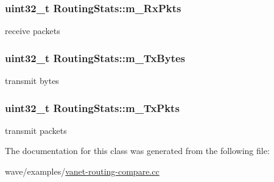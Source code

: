 \subsubsection[{\texorpdfstring{m\+\_\+\+Rx\+Pkts}{m_RxPkts}}]{\setlength{\rightskip}{0pt plus 5cm}uint32\+\_\+t Routing\+Stats\+::m\+\_\+\+Rx\+Pkts\hspace{0.3cm}{\ttfamily [private]}}\hypertarget{classRoutingStats_a794a76bc6ef6fa000c846c970909e441}{}\label{classRoutingStats_a794a76bc6ef6fa000c846c970909e441}


receive packets 

\subsubsection[{\texorpdfstring{m\+\_\+\+Tx\+Bytes}{m_TxBytes}}]{\setlength{\rightskip}{0pt plus 5cm}uint32\+\_\+t Routing\+Stats\+::m\+\_\+\+Tx\+Bytes\hspace{0.3cm}{\ttfamily [private]}}\hypertarget{classRoutingStats_ae3df3a8c90e042d2a9e5a341b56b207a}{}\label{classRoutingStats_ae3df3a8c90e042d2a9e5a341b56b207a}


transmit bytes 

\subsubsection[{\texorpdfstring{m\+\_\+\+Tx\+Pkts}{m_TxPkts}}]{\setlength{\rightskip}{0pt plus 5cm}uint32\+\_\+t Routing\+Stats\+::m\+\_\+\+Tx\+Pkts\hspace{0.3cm}{\ttfamily [private]}}\hypertarget{classRoutingStats_a34e64661d6d5886863226f0c0dd7d613}{}\label{classRoutingStats_a34e64661d6d5886863226f0c0dd7d613}


transmit packets 



The documentation for this class was generated from the following file\+:\begin{DoxyCompactItemize}
\item 
wave/examples/\hyperlink{vanet-routing-compare_8cc}{vanet-\/routing-\/compare.\+cc}\end{DoxyCompactItemize}
